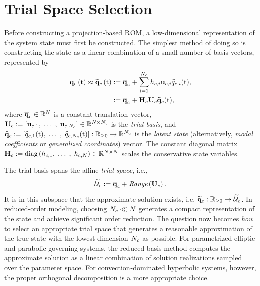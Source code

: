 \section{Trial Space Selection}
%
Before constructing a projection-based ROM, a low-dimensional representation of the system state must first be constructed. The simplest method of doing so is constructing the state as a linear combination of a small number of basis vectors, represented by
%
\begin{equation}\label{eq:consSolApprox}
    \begin{aligned}
        \consFunc{\timeVar} \approx \consFuncRom{\timeVar} &\defEq \consVecCent + \sum_{\dummyIdx=1}^{\numConsModes} \consScaleVar{\dummyIdx} \consTrialVecIdx \consVarCoefIdx (\timeVar), \\
        &\defEq \consAffineMap(\timeVar),
    \end{aligned}
\end{equation}
%
where $\mathbf{\overline{q}}_{c} \in \mathbb{R}^{N}$ is a constant translation vector, $\consTrial \defEq \left[\consTrialVec{1}, \; \hdots \;, \; \consTrialVec{\numConsModes}\right] \inRTwo{\numDOF}{\numConsModes}$ is the \textit{trial basis}, and $\mathbf{\widehat{q}}_{c} := \left[\widehat{q}_{c,1}(\text{t}), \;\hdots \;, \;\widehat{q}_{c,N_c}(\text{t})\right]: \mathbb{R}_{\ge 0} \rightarrow \mathbb{R}^{N_c}$ is the \textit{latent state} (alternatively, \textit{modal coefficients} or \textit{generalized coordinates}) vector. The constant diagonal matrix $\consScale \defEq \text{diag}\left(\consScaleVar{1}, \; \hdots \;, \; \consScaleVar{\numDOF}\right) \inRTwo{\numDOF}{\numDOF}$ scales the conservative state variables.

The trial basis spans the affine \textit{trial space}, i.e.,
%
\begin{equation}
    \consTrialSpace \defEq \consVecCent + \textit{Range}\left(\consTrial\right).
\end{equation}
%
It is in this subspace that the approximate solution exists, i.e. $\funcMap{\consVecRom}{\nonnegReals}{\consTrialSpace}$. In reduced-order modeling, choosing $N_c \ll N$ generates a compact representation of the state and achieve significant order reduction. The question now becomes \textit{how} to select an appropriate trial space that generates a reasonable approximation of the true state with the lowest dimension $N_c$ as possible. For parametrized elliptic and parabolic governing systems, the reduced basis method computes the approximate solution as a linear combination of solution realizations sampled over the parameter space. For convection-dominated hyperbolic systems, however, the proper orthogonal decomposition is a more appropriate choice.

